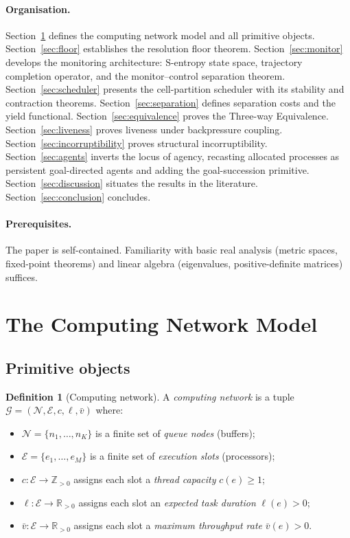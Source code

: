 \documentclass[11pt,twocolumn,a4paper]{article}
\theoremstyle{plain}
\theoremstyle{definition}
\newtheorem{definition}[theorem]{Definition}
\theoremstyle{remark}
\newcommand{\N}{\mathcal{N}}
\newcommand{\E}{\mathcal{E}}
\newcommand{\G}{\mathcal{G}}
\newcommand{\R}{\mathbb{R}}
\begin{document}
\paragraph{Organisation.} Section~\ref{sec:model} defines the computing network model and all primitive objects. Section~\ref{sec:floor} establishes the resolution floor theorem. Section~\ref{sec:monitor} develops the monitoring architecture: S-entropy state space, trajectory completion operator, and the monitor--control separation theorem. Section~\ref{sec:scheduler} presents the cell-partition scheduler with its stability and contraction theorems. Section~\ref{sec:separation} defines separation costs and the yield functional. Section~\ref{sec:equivalence} proves the Three-way Equivalence. Section~\ref{sec:liveness} proves liveness under backpressure coupling. Section~\ref{sec:incorruptibility} proves structural incorruptibility. Section~\ref{sec:agents} inverts the locus of agency, recasting allocated processes as persistent goal-directed agents and adding the goal-succession primitive. Section~\ref{sec:discussion} situates the results in the literature. Section~\ref{sec:conclusion} concludes.

\paragraph{Prerequisites.} The paper is self-contained. Familiarity with basic real analysis (metric spaces, fixed-point theorems) and linear algebra (eigenvalues, positive-definite matrices) suffices.

\section{The Computing Network Model}
\label{sec:model}

\subsection{Primitive objects}

\begin{definition}[Computing network]
\label{def:network}
A \emph{computing network} is a tuple $\G = (\N, \E, c, \ell, \bar{v})$ where:
\begin{itemize}[nosep]
\item $\N = \{n_1, \ldots, n_K\}$ is a finite set of \emph{queue nodes} (buffers);
\item $\E = \{e_1, \ldots, e_M\}$ is a finite set of \emph{execution slots} (processors);
\item $c : \E \to \mathbb{Z}_{>0}$ assigns each slot a \emph{thread capacity} $c(e) \geq 1$;
\item $\ell : \E \to \R_{>0}$ assigns each slot an \emph{expected task duration} $\ell(e) > 0$;
\item $\bar{v} : \E \to \R_{>0}$ assigns each slot a \emph{maximum throughput rate} $\bar{v}(e) > 0$.
\end{itemize}
\end{definition}
\end{document}
